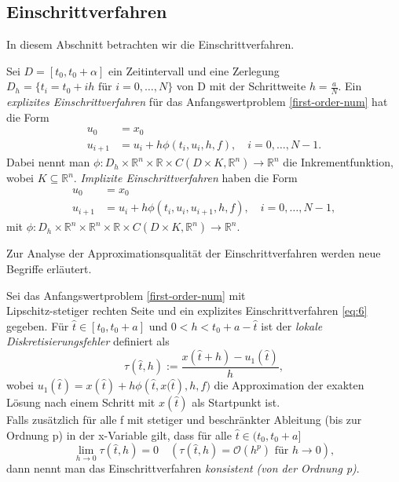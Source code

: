 \subsection{Einschrittverfahren}
In diesem Abschnitt betrachten wir die Einschrittverfahren.
\begin{definition}
    Sei $D=[t_0,t_0+\alpha]$ ein Zeitintervall und eine Zerlegung $D_h=\{t_i=t_0 + ih \text{ für } i=0, \dots,N\}$ von D mit der
    Schrittweite $h=\frac{a}{N}$.
    Ein {\em explizites Einschrittverfahren} für das Anfangswertproblem \eqref{first-order-num} hat die Form
    \begin{align}
        u_0 &= x_0 \nonumber \\
        u_{i+1} &= u_i + h \phi(t_i,u_i,h,f), \quad i=0,\dots,N-1. \label{eq:6}
    \end{align}
    Dabei nennt man
    $\phi:D_h \times \mathbb{R}^n \times \mathbb{R} \times C(D \times K,\mathbb{R}^n) \rightarrow \mathbb{R}^n$ die
    Inkrementfunktion, wobei $K \subseteq \mathbb{R}^n$.
    {\em Implizite Einschrittverfahren} haben die Form
    \begin{align*}
        u_0 &= x_0\\
        u_{i+1} &= u_i + h\phi(t_i,u_i,u_{i+1},h,f), \quad i=0,\dots,N-1,
    \end{align*}
    mit $\phi:D_h \times \mathbb{R}^n \times \mathbb{R}^n \times \mathbb{R} \times C(D \times K,\mathbb{R}^n)
    \rightarrow \mathbb{R}^n$.
\end{definition}
Zur Analyse der Approximationsqualität der Einschrittverfahren werden neue Begriffe erläutert.
\begin{definition}
    Sei das Anfangswertproblem \eqref{first-order-num} mit \\ Lipschitz-stetiger
    rechten Seite und ein explizites Einschrittverfahren \eqref{eq:6} gegeben. Für $\hat{t}\in [t_0,t_0+a]$ und
    $0 < h < t_0 + a - \hat{t}$ ist der {\em lokale Diskretisierungsfehler} definiert als
    \[
        \tau(\hat{t}, h) := \frac{x(\hat{t} + h) - u_1(\hat{t})}{h},
    \] wobei $u_1(\hat{t})=x(\hat{t}) + h\phi\left(\hat{t},x(\hat{t}\right),h,f) $ die Approximation der exakten
    Lösung nach einem Schritt mit $x(\hat{t})$ als Startpunkt ist.\\
    Falls zusätzlich für alle f mit stetiger und beschränkter Ableitung (bis zur Ordnung p) in der x-Variable gilt, dass
    für alle $\hat{t} \in (t_0, t_0+a]$
    \[
        \lim_{h \rightarrow 0 } \tau(\hat{t}, h)=0 \quad (\tau(\hat{t},h) = \mathcal{O}(h^p) \text{ für } h \rightarrow 0),
    \] dann nennt man das Einschrittverfahren {\em konsistent} {\em (von der Ordnung p)}.
\end{definition}
